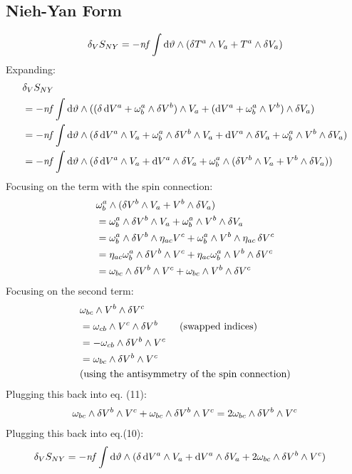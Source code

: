 \documentclass[12pt]{article}
\begin{document}
\subsection{Nieh-Yan Form}
\begin{align*}
  \var_V{S_{NY}} = -\mathit{nf}\int \dd\vartheta \wedge (\var{T^a} \wedge V_a + T^a \wedge \var{V_a})
\end{align*}
Expanding:
\begin{align}
  &\var_V{S_{NY}} \nonumber \\ &= -\mathit{nf}\int \dd\vartheta \wedge ((\var{\dd{V^a}} + \omega^a_b \wedge \var{V^b}) \wedge V_a + (\dd V^a + \omega^a_b \wedge V^b) \wedge \var{V_a}) \nonumber \\
  &= -\mathit{nf}\int \dd\vartheta \wedge (\var{\dd{V^a}} \wedge V_a + \omega^a_b \wedge \var{V^b} \wedge V_a + \dd V^a \wedge \var{V_a} + \omega^a_b \wedge V^b \wedge \var{V_a}) \nonumber \\
  &= -\mathit{nf}\int \dd\vartheta \wedge (\var{\dd{V^a}} \wedge V_a + \dd V^a \wedge \var{V_a} + \omega^a_b \wedge (\var{V^b} \wedge V_a + V^b \wedge \var{V_a}))
\end{align}
Focusing on the term with the spin connection:
\begin{align}
  &\omega^a_b \wedge (\var{V^b} \wedge V_a + V^b \wedge \var{V_a}) \nonumber \\
  &= \omega^a_b \wedge \var{V^b} \wedge V_a + \omega^a_b \wedge V^b \wedge \var{V_a} \nonumber \\
  &= \omega^a_b \wedge \var{V^b} \wedge \eta_{ac}V^c + \omega^a_b \wedge V^b \wedge \eta_{ac}\var{V^c} \nonumber \\
  &= \eta_{ac}\omega^a_b \wedge \var{V^b} \wedge V^c + \eta_{ac}\omega^a_b \wedge V^b \wedge \var{V^c} \nonumber \\
  &= \omega_{bc} \wedge \var{V^b} \wedge V^c + \omega_{bc} \wedge V^b \wedge \var{V^c}
\end{align}
Focusing on the second term:
\begin{align*}
  &\omega_{bc} \wedge V^b \wedge \var{V^c} \\
  &=\omega_{cb} \wedge V^c \wedge \var{V^b} \qquad \text{(swapped indices)} \\
  &=-\omega_{cb} \wedge \var{V^b} \wedge V^c \\
  &=\omega_{bc} \wedge \var{V^b} \wedge V^c \\ &\text{(using the antisymmetry of the spin connection)}
\end{align*}
Plugging this back into eq. (11):
\begin{align*}
  \omega_{bc} \wedge \var{V^b} \wedge V^c + \omega_{bc} \wedge \var{V^b} \wedge V^c = 2\omega_{bc} \wedge \var{V^b} \wedge V^c
\end{align*}
Plugging this back into eq.(10):
\begin{align}
  \var_V{S_{NY}} &= -\mathit{nf}\int \dd\vartheta \wedge (\var{\dd{V^a}} \wedge V_a + \dd V^a \wedge \var{V_a} + 2\omega_{bc} \wedge \var{V^b} \wedge V^c)
\end{align}
\end{document}
